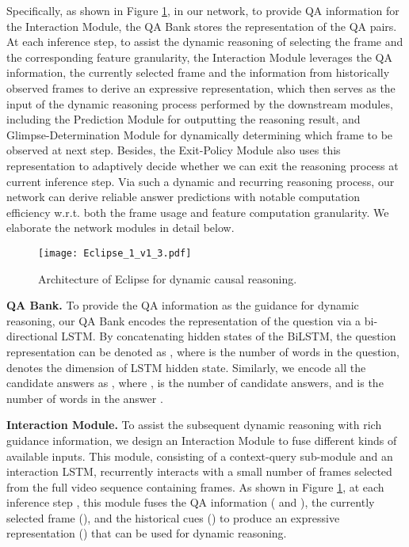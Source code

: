 \documentclass[final]{cvpr}
\begin{document}
Specifically, as shown in Figure \ref{fig:Eclipse},
in our network, to provide QA information for the Interaction Module, the QA Bank stores the representation of the QA pairs. 
At each inference step, to assist the dynamic reasoning of selecting the frame and the corresponding feature granularity, the Interaction Module leverages the QA information, the currently selected frame and the information from historically observed frames to derive an expressive representation, 
which then serves as the input of the dynamic reasoning process performed by the downstream modules, including the Prediction Module for outputting the reasoning result, and
Glimpse-Determination Module for dynamically determining which frame to be observed at next step. 
Besides, the Exit-Policy Module also uses this representation to adaptively decide whether we can exit the reasoning process at current inference step. 
Via such a dynamic and recurring reasoning process, our network can derive reliable answer predictions with notable computation efficiency w.r.t. both the frame usage and feature computation granularity. We elaborate the network modules in detail below.

\begin{figure}[tbp]
\begin{center}
    \texttt{[image: Eclipse\_1\_v1\_3.pdf]}
\end{center}
\vspace{-0.5cm}
\setlength\abovecaptionskip{-2cm}   
\setlength\belowcaptionskip{-2cm}
\caption{Architecture of Eclipse for dynamic causal reasoning.}
\label{fig:Eclipse}
\vspace{-0.4cm}
\end{figure}

{\bf QA Bank.} To provide the QA information as the guidance for dynamic reasoning, our QA Bank encodes the representation of the question via a bi-directional LSTM. 
By concatenating hidden states of the BiLSTM, the question representation can be denoted as , where  is the number of words in the question,  denotes the dimension of LSTM hidden state. Similarly, we encode all the candidate answers as
,
where ,
 is the number of candidate answers, 
and  is the number of words in the answer .


{\bf Interaction Module.} To assist the subsequent dynamic reasoning with rich guidance information, we design an Interaction Module to fuse different kinds of available inputs. This module, consisting of a context-query sub-module and an interaction LSTM, recurrently interacts with a small number of frames selected from the full video sequence containing  frames. As shown in Figure \ref{fig:Eclipse}, at each inference step , this module fuses the QA information ( and ),
the currently selected frame (), and the historical cues ()
to produce an expressive representation () that can be used for dynamic reasoning. 
\end{document}
